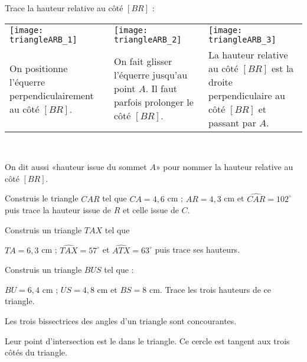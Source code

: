 \begin{methode*1}

 \begin{exemple*1}
 Trace la hauteur relative au côté $[BR]$ :
 \begin{tabularx}{\textwidth}{X|X|X}
 \texttt{[image: triangleARB\_1]} &  \texttt{[image: triangleARB\_2]} & \texttt{[image: triangleARB\_3]} \\ 
 On positionne l'équerre perpendiculairement au côté $[BR]$. & On fait glisser l'équerre jusqu'au point $A$. Il faut parfois prolonger le côté $[BR]$. & La hauteur relative au côté $[BR]$ est la droite perpendiculaire au côté $[BR]$ et passant par $A$. \\
\end{tabularx} \\

\end{exemple*1}

\begin{remarque}
On dit aussi «hauteur issue du sommet $A$» pour nommer la hauteur relative au côté $[BR]$.
 \end{remarque}
 
\exercice
Construis le triangle $CAR$ tel que 
$CA = 4,6$ cm ; $AR = 4,3$ cm et $\widehat{CAR} = 102^\circ$ puis trace la hauteur issue de $R$ et celle issue de $C$.
\vspace{2cm}
     
\exercice
Construis un triangle $TAX$ tel que 

$TA = 6,3$ cm ; $\widehat{TAX} = 57^\circ$ et $\widehat{ATX} = 63^\circ$ puis trace ses hauteurs.
\vspace{2cm}

\exercice
Construis un triangle $BUS$ tel que :

$BU = 6,4$ cm ; $US = 4,8$ cm et $BS = 8$ cm. Trace les trois hauteurs de ce triangle.

\end{methode*1}




 \newpage
 
 \begin{aconnaitre}
Les trois bissectrices des angles d'un triangle sont concourantes. 

Leur point d'intersection est le  dans le triangle. Ce cercle est tangent aux trois côtés du triangle.
 \end{aconnaitre}
 
